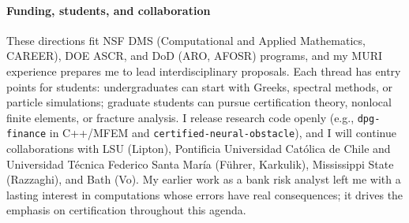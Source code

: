\documentclass[11pt]{article}
\begin{document}
\paragraph{Funding, students, and collaboration}
These directions fit NSF DMS (Computational and Applied Mathematics, CAREER),
DOE ASCR, and DoD (ARO, AFOSR) programs, and my MURI experience prepares me to
lead interdisciplinary proposals. Each thread has entry points for students:
undergraduates can start with Greeks, spectral methods, or particle simulations;
graduate students can pursue certification theory, nonlocal finite elements, or
fracture analysis. I release research code openly (e.g., \texttt{dpg-finance}
in C++/MFEM and \texttt{certified-neural-obstacle}), and I will continue
collaborations with LSU (Lipton), Pontificia Universidad Cat\'olica de Chile
and Universidad T\'ecnica Federico Santa Mar\'ia (F\"uhrer, Karkulik),
Mississippi State (Razzaghi), and Bath (Vo). My earlier work as a bank risk analyst
left me with a lasting interest in computations whose errors have real
consequences; it drives the emphasis on certification throughout this agenda.

\vspace{-4pt}
\end{document}
